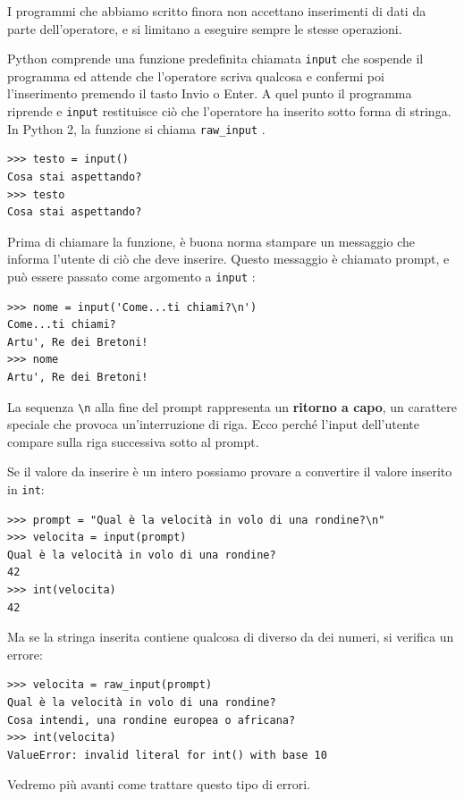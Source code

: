 \documentclass[10pt]{book}
\begin{document}
I programmi che abbiamo scritto finora non accettano inserimenti di dati da parte dell'operatore, e si limitano a eseguire sempre le stesse operazioni.

Python comprende una funzione predefinita chiamata \verb"input" che sospende il programma ed attende che l'operatore scriva qualcosa e confermi poi l'inserimento premendo il tasto {\sf Invio} o {\sf Enter}. A quel punto il programma riprende e \verb"input" restituisce ciò che l'operatore ha inserito sotto forma di stringa. In Python 2, la funzione si chiama \verb"raw_input" .

\begin{verbatim}
>>> testo = input()
Cosa stai aspettando?
>>> testo
Cosa stai aspettando?
\end{verbatim}
%
Prima di chiamare la funzione, è buona norma stampare un messaggio che informa l'utente di ciò che deve inserire. Questo messaggio è chiamato prompt, e può essere passato come argomento a \verb"input" :

\begin{verbatim}
>>> nome = input('Come...ti chiami?\n')
Come...ti chiami?
Artu', Re dei Bretoni!
>>> nome
Artu', Re dei Bretoni!
\end{verbatim}
%
La sequenza \verb"\n" alla fine del prompt rappresenta un {\bf ritorno a capo},
un carattere speciale che provoca un'interruzione di riga. Ecco perché l'input dell'utente compare sulla riga successiva sotto al prompt.

Se il valore da inserire è un intero possiamo provare a convertire il valore inserito in {\tt int}:


\begin{verbatim}
>>> prompt = "Qual è la velocità in volo di una rondine?\n"
>>> velocita = input(prompt)
Qual è la velocità in volo di una rondine?
42
>>> int(velocita)
42
\end{verbatim}
%
Ma se la stringa inserita contiene qualcosa di diverso da dei numeri, si verifica un errore:

\begin{verbatim}
>>> velocita = raw_input(prompt)
Qual è la velocità in volo di una rondine?
Cosa intendi, una rondine europea o africana?
>>> int(velocita)
ValueError: invalid literal for int() with base 10
\end{verbatim}
%
Vedremo più avanti come trattare questo tipo di errori.
\end{document}

